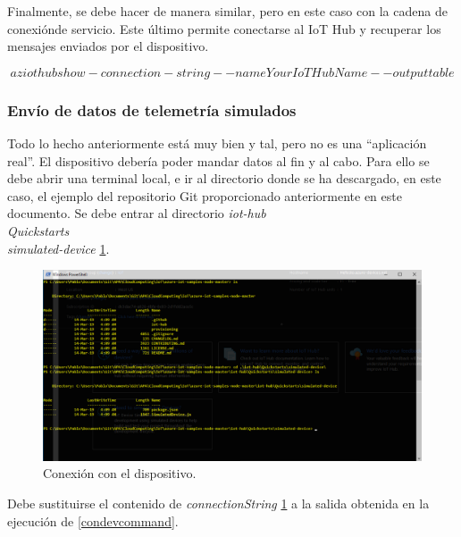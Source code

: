 \documentclass[10pt]{article}
\begin{document}
Finalmente, se debe hacer de manera similar, pero en este caso con la cadena de
conexiónde servicio. Este último permite conectarse al IoT Hub y recuperar los
mensajes enviados por el dispositivo.

\begin{equation}
 \label{consercommand}
az iot hub show-connection-string --name YourIoTHubName --output table
\end{equation}

\subsubsection{Envío de datos de telemetría simulados}

Todo lo hecho anteriormente está muy bien y tal\ldtos, pero no es una
``aplicación real''. El dispositivo debería poder mandar datos al fin y al cabo.
Para ello se debe abrir una terminal local, e ir al directorio donde se ha
descargado, en este caso, el ejemplo del repositorio Git proporcionado
anteriormente en este documento. Se debe entrar al directorio
\textit{iot-hub\\Quickstarts\\simulated-device}
\hyperref[directory]{\ref{directory}}.

\begin{figure}[h!]
 \includegraphics[width=\linewidth]{./IoT/MicrosoftAzure/4-1_send_simulated_telemetry.png}
 \caption{Conexión con el dispositivo.}
 \label{directory}
\end{figure}

Debe sustituirse el contenido de \textit{connectionString}
\hyperref[directory]{\ref{directory}} a la salida obtenida en la ejecución de 
\hyperref[condevcommand]{\ref{condevcommand}}.
\end{document}
